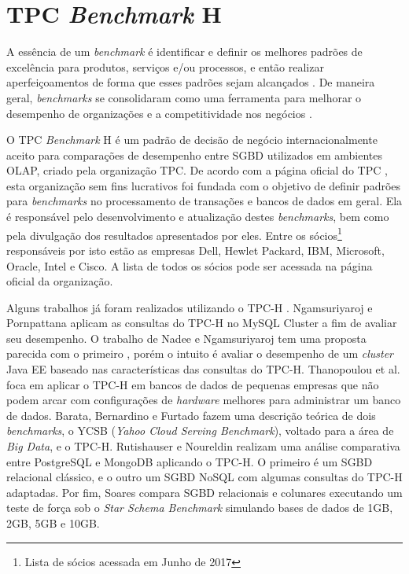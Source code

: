 \chapter{TPC \textit{Benchmark} H}
\label{tpch}

A essência de um \textit{benchmark} é identificar e definir os melhores padrões de excelência para produtos, serviços e/ou processos, e então realizar aperfeiçoamentos de forma que esses padrões sejam alcançados \cite{bhutta1999benchmarking}. De maneira geral, \textit{benchmarks} se consolidaram como uma ferramenta para melhorar o desempenho de organizações e a competitividade nos negócios \cite{kyro2003revising}.

O TPC \textit{\textit{Benchmark}} H é um padrão de decisão de negócio internacionalmente aceito para comparações de desempenho entre SGBD utilizados em ambientes OLAP, criado pela organização TPC. De acordo com a página oficial do TPC \cite{tpc2017page}, esta organização sem fins lucrativos foi fundada com o objetivo de definir padrões para \textit{benchmarks} no processamento de transações e bancos de dados em geral. Ela é responsável pelo desenvolvimento e atualização destes \textit{benchmarks}, bem como pela divulgação dos resultados apresentados por eles. Entre os sócios\footnote{Lista de sócios acessada em Junho de 2017} responsáveis por isto estão as empresas Dell, Hewlet Packard, IBM, Microsoft, Oracle, Intel e Cisco. A lista de todos os sócios pode ser acessada na página oficial da organização.

Alguns trabalhos já foram realizados utilizando o TPC-H \cite{ngamsuriyaroj2010performance, nadee2012performance, thanopoulou2012benchmarking, barata2014ycsb, rutishauser2012tpc, soares2012avaliaccao}. Ngamsuriyaroj e Pornpattana \cite{ngamsuriyaroj2010performance} aplicam as consultas do TPC-H no MySQL Cluster a fim de avaliar seu desempenho. O trabalho de Nadee e Ngamsuriyaroj \cite{nadee2012performance} tem uma proposta parecida com o primeiro \cite{ngamsuriyaroj2010performance}, porém o intuito é avaliar o desempenho de um \textit{cluster} Java EE baseado nas características das consultas do TPC-H. Thanopoulou et al. \cite{thanopoulou2012benchmarking} foca em aplicar o TPC-H em bancos de dados de pequenas empresas que não podem arcar com configurações de \textit{hardware} melhores para administrar um banco de dados. Barata, Bernardino e Furtado \cite{barata2014ycsb} fazem uma descrição teórica de dois \textit{benchmarks}, o YCSB (\textit{Yahoo Cloud Serving Benchmark}), voltado para a área de \textit{Big Data}, e o TPC-H. Rutishauser e Noureldin \cite{rutishauser2012tpc} realizam uma análise comparativa entre PostgreSQL e MongoDB aplicando o TPC-H. O primeiro é um SGBD relacional clássico, e o outro um SGBD NoSQL com algumas consultas do TPC-H adaptadas. Por fim, Soares \cite{soares2012avaliaccao} compara SGBD relacionais e colunares executando um teste de força sob o \textit{Star Schema Benchmark} simulando bases de dados de 1GB, 2GB, 5GB e 10GB.

